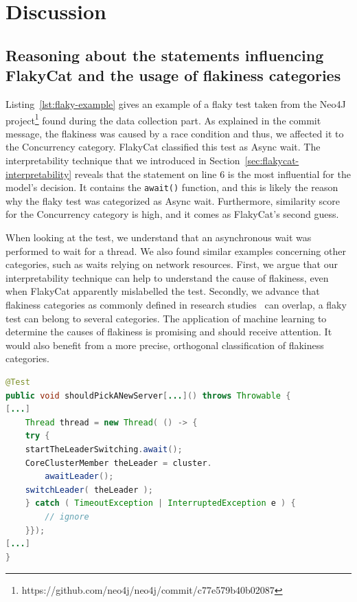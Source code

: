 \section{Discussion}
\label{sec:flakycat-discussion}

\subsection{Reasoning about the statements influencing FlakyCat and the usage of flakiness categories}
\label{sec:discussion:reasoning}

Listing~\ref{lst:flaky-example} gives an example of a flaky test taken from the Neo4J project\footnote{https://github.com/neo4j/neo4j/commit/c77e579b40b02087} found during the data collection part.
As explained in the commit message, the flakiness was caused by a race condition and thus, we affected it to the Concurrency category. FlakyCat classified this test as Async wait. The interpretability technique that we introduced in Section~\ref{sec:flakycat-interpretability} reveals that the statement on line 6 is the most influential for the model's decision. It contains the \texttt{await()} function, and this is likely the reason why the flaky test was categorized as Async wait. Furthermore, similarity score for the Concurrency category is high, and it comes as FlakyCat's second guess. 

When looking at the test, we understand that an asynchronous wait was performed to wait for a thread. We also found similar examples concerning other categories, such as waits relying on network resources. First, we argue that our interpretability technique can help to understand the cause of flakiness, even when FlakyCat apparently mislabelled the test. Secondly, we advance that flakiness categories as commonly defined in research studies~\cite{Luo2014, Eck2019} can overlap, \ie a flaky test can belong to several categories. The application of machine learning to determine the causes of flakiness is promising and should receive attention. It would also benefit from a more precise, orthogonal classification of flakiness categories. \\


\begin{lstlisting}[caption={A flaky test belonging to two categories
},label={lst:flaky-example},language=Java]
@Test
public void shouldPickANewServer[...]() throws Throwable {
[...]
    Thread thread = new Thread( () -> {
    try {
    startTheLeaderSwitching.await();
    CoreClusterMember theLeader = cluster.
        awaitLeader();
    switchLeader( theLeader );
    } catch ( TimeoutException | InterruptedException e ) {
        // ignore
    }});
[...]
}
\end{lstlisting}

